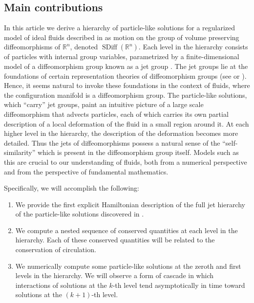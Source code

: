 \documentclass[12pt]{amsart}
\newcommand{\R}{\ensuremath{\mathbb{R}}}
\DeclareMathOperator{\SDiff}{SDiff}
\begin{document}
\subsection{Main contributions}
 In this article we derive a hierarchy of particle-like
solutions for a regularized model of ideal fluids described in  \cite{MumfordMichor2013} as motion on the group of volume preserving
diffeomorphisms of $\R^n$, denoted $\SDiff(\R^n)$.
Each level in the hierarchy consists of particles
with internal group variables, parametrized by
a finite-dimensional model of a diffeomorphism group 
known as a jet group \cite[Chapter 4]{KMS99}.
The jet groups lie at the foundations of certain representation theories of diffeomorphism groups (see \cite[Appendix 2]{VershikGelfandGraev1975} or \cite{Kirillov1981}).
Hence, it seems natural to invoke these foundations in the context of fluids, where the configuration manifold is a diffeomorphism group.
The particle-like solutions, which ``carry'' jet groups, paint an intuitive picture of a large scale diffeomorphism that advects particles,
each of which carries its own partial description of a local deformation of the fluid in a small region around it.
At each higher level in the hierarchy, the description of the deformation becomes more detailed.
Thus the jets of diffeomorphisms possess a natural sense of the ``self-similarity'' which is present in the diffeomorphism group itself.
 Models such as this are crucial to our understanding of fluids,
  both from a numerical perspective and from the perspective
  of fundamental mathematics.

 Specifically, we will accomplish the following:
\begin{enumerate}
  \item We provide the first explicit Hamiltonian description of the full jet hierarchy of the particle-like solutions discovered in 
  	\cite{JacobsRatiuDesbrun2013,CotterHolmJacobsMeier2014}.
  \item We compute a nested sequence of conserved quantities at 
    each level in the hierarchy.
    Each of these conserved quantities will be related to the conservation
    of circulation.
  \item We numerically compute some particle-like solutions at the zeroth and first levels in the hierarchy.  We will observe a form of cascade in which interactions of solutions at the $k$-th level tend asymptotically in time toward solutions at the $(k+1)$-th level.
\end{enumerate}
\end{document}
